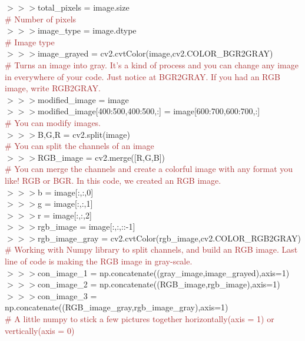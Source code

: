 \documentclass[a4paper,18pt]{article}
\begin{document}
$>>>$total\_pixels = image.size\\{\textcolor{brown}{\# Number of pixels}}\\

$>>>$image\_type = image.dtype\\{\textcolor{brown}{\# Image type}}\\

$>>>$image\_grayed = cv2.cvtColor(image,cv2.COLOR\_BGR2GRAY)\\{\textcolor{brown}{\# Turns an image into gray. It's a kind of process and you can change any image in everywhere of your code. Just notice at BGR2GRAY. If you had an RGB image, write RGB2GRAY.}}\\

$>>>$modified\_image = image\\
\hspace*{14pt}$>>>$modified\_image[400:500,400:500,:] = image[600:700,600:700,:]\\{\textcolor{brown}{\# You can modify images.}}\\

$>>>$B,G,R = cv2.split(image)\\{\textcolor{brown}{\# You can split the channels of an image}}\\

$>>>$RGB\_image = cv2.merge([R,G,B])\\{\textcolor{brown}{\# You can merge the channels and create a colorful image with any format you like! RGB or BGR. In this code, we created an RGB image.}}\\

$>>>$b = image[:,:,0]\\
\hspace*{14pt}$>>>$g = image[:,:,1]\\
\hspace*{14pt}$>>>$r = image[:,:,2]\\
\hspace*{14pt}$>>>$rgb\_image = image[:,:,::-1]\\
\hspace*{14pt}$>>>$rgb\_image\_gray = cv2.cvtColor(rgb\_image,cv2.COLOR\_RGB2GRAY)\\{\textcolor{brown}{\# Working with Numpy library to split channels, and build an RGB image. Last line of code is making the RGB image in gray-scale.}}\\

$>>>$con\_image\_1 = np.concatenate((gray\_image,image\_grayed),axis=1)\\
\hspace*{14pt}$>>>$con\_image\_2 = np.concatenate((RGB\_image,rgb\_image),axis=1)\\
\hspace*{14pt}$>>>$con\_image\_3 = np.concatenate((RGB\_image\_gray,rgb\_image\_gray),axis=1)\\{\textcolor{brown}{\# A little numpy to stick a few pictures together horizontally(axis = 1) or vertically(axis = 0)}}\\
\end{document}
